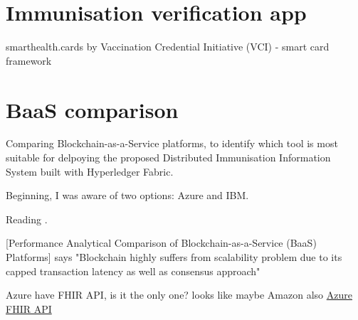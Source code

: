 \documentclass{article}
\begin{document}
\begin{flushleft}
\section{Immunisation verification app}
smarthealth.cards by Vaccination Credential Initiative (VCI) - smart card framework

\section{BaaS comparison}
Comparing Blockchain-as-a-Service platforms, to identify which tool is most suitable for delpoying the proposed Distributed Immunisation Information System built with Hyperledger Fabric.\linebreak[1]

Beginning, I was aware of two options: Azure and IBM.\linebreak[1]

Reading \cite{onik_performance_2019}.\linebreak[1]

[Performance Analytical Comparison of Blockchain-as-a-Service (BaaS) Platforms] says "Blockchain highly suffers from scalability problem due to its capped transaction
latency as well as consensus approach"\linebreak[1]

Azure have FHIR API, is it the only one? looks like maybe Amazon also \href{'https://azure.microsoft.com/en-gb/services/azure-api-for-fhir/?ocid=AID754288&wt.mc_id=azfr-c9-scottha%2CCFID0475'}{Azure FHIR API}




\end{flushleft}

\printbibliography
\end{document}
